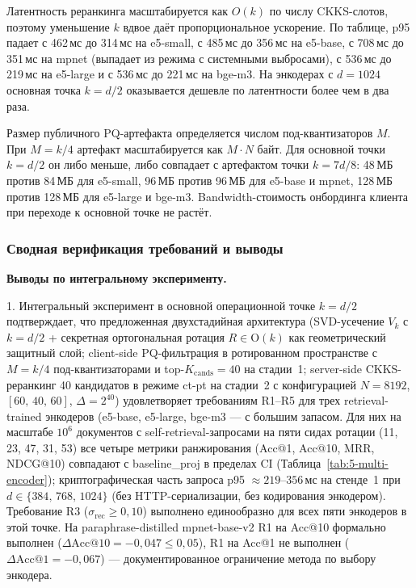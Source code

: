 \documentclass[a4paper, 12pt, oneside, openany]{article}
\begin{document}
Латентность реранкинга масштабируется как $O(k)$ по числу CKKS-слотов, поэтому уменьшение $k$ вдвое даёт пропорциональное ускорение. По таблице, p95 падает с 462\,мс до 314\,мс на e5-small, с 485\,мс до 356\,мс на e5-base, с 708\,мс до 351\,мс на mpnet (выпадает из режима с системными выбросами), с 536\,мс до 219\,мс на e5-large и с 536\,мс до 221\,мс на bge-m3. На энкодерах с $d = 1024$ основная точка $k = d/2$ оказывается дешевле по латентности более чем в два раза.

Размер публичного PQ-артефакта определяется числом под-квантизаторов $M$. При $M = k/4$ артефакт масштабируется как $M \cdot N$ байт. Для основной точки $k = d/2$ он либо меньше, либо совпадает с артефактом точки $k = 7d/8$: 48\,МБ против 84\,МБ для e5-small, 96\,МБ против 96\,МБ для e5-base и mpnet, 128\,МБ против 128\,МБ для e5-large и bge-m3. Bandwidth-стоимость онбординга клиента при переходе к основной точке не растёт.



\subsubsection{Сводная верификация требований и выводы}



\textbf{Выводы по интегральному эксперименту.}

1. Интегральный эксперимент в основной операционной точке $k = d/2$ подтверждает, что предложенная двухстадийная архитектура (SVD-усечение $V_k$ с $k = d/2$ + секретная ортогональная ротация $R \in \mathrm{O}(k)$ как геометрический защитный слой; client-side PQ-фильтрация в ротированном пространстве с $M = k/4$ под-квантизаторами и top-$K_{\mathrm{cands}} = 40$ на стадии~1; server-side CKKS-реранкинг 40 кандидатов в режиме ct-pt на стадии~2 с конфигурацией $N = 8192$, $[60,\,40,\,60]$, $\Delta = 2^{40}$) удовлетворяет требованиям R1--R5 для трех retrieval-trained энкодеров (e5-base, e5-large, bge-m3 --- с большим запасом. Для них на масштабе $10^6$ документов с self-retrieval-запросами на пяти сидах ротации (11, 23, 47, 31, 53) все четыре метрики ранжирования (Acc@1, Acc@10, MRR, NDCG@10) совпадают с baseline\_proj в пределах CI (Таблица~\ref{tab:5-multi-encoder}); криптографическая часть запроса p95 $\approx 219$--$356$\,мс на стенде~1 при $d \in \{384,\,768,\,1024\}$ (без HTTP-сериализации, без кодирования энкодером). Требование R3 ($\sigma_{\mathrm{rec}} \geq 0{,}10$) выполнено единообразно для всех пяти энкодеров в этой точке. На paraphrase-distilled mpnet-base-v2 R1 на Acc@10 формально выполнен ($\Delta\mathrm{Acc@10} = -0{,}047 \leq 0{,}05$), R1 на Acc@1 не выполнен ($\Delta\mathrm{Acc@1} = -0{,}067$) --- документированное ограничение метода по выбору энкодера.
\end{document}
